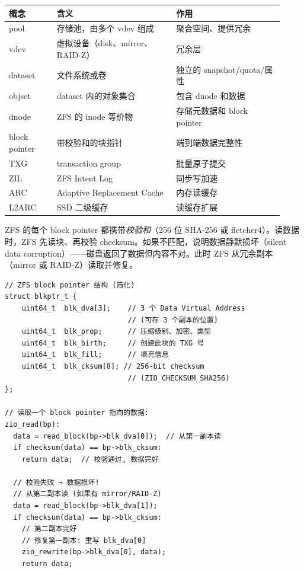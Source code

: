 \begin{filesystemlayout}
\begin{longtable}{|F{0.16\linewidth}|F{0.40\linewidth}|F{0.36\linewidth}|}
\toprule
{}
概念 & 含义 & 作用 \\
\midrule
pool & 存储池，由多个 vdev 组成 & 聚合空间、提供冗余 \\\tablerowrule
vdev & 虚拟设备（disk、mirror、RAID-Z） & 冗余层 \\\tablerowrule
dataset & 文件系统或卷 & 独立的 snapshot/quota/属性 \\\tablerowrule
objset & dataset 内的对象集合 & 包含 dnode 和数据 \\\tablerowrule
dnode & ZFS 的 inode 等价物 & 存储元数据和 block pointer \\\tablerowrule
block pointer & 带校验和的块指针 & 端到端数据完整性 \\\tablerowrule
TXG & transaction group & 批量原子提交 \\\tablerowrule
ZIL & ZFS Intent Log & 同步写加速 \\\tablerowrule
ARC & Adaptive Replacement Cache & 内存读缓存 \\\tablerowrule
L2ARC & SSD 二级缓存 & 读缓存扩展 \\
\bottomrule
\end{longtable}

ZFS 的每个 block pointer 都携带\emph{校验和}（256 位 SHA-256 或 fletcher4）。读数据时，ZFS 先读块、再校验 checksum。如果不匹配，说明数据静默损坏（silent data corruption）——磁盘返回了数据但内容不对。此时 ZFS 从冗余副本（mirror 或 RAID-Z）读取并修复。

\begin{lstlisting}
// ZFS block pointer 结构 (简化)
struct blkptr_t {
    uint64_t  blk_dva[3];    // 3 个 Data Virtual Address
                             // (可存 3 个副本的位置)
    uint64_t  blk_prop;      // 压缩级别、加密、类型
    uint64_t  blk_birth;     // 创建此块的 TXG 号
    uint64_t  blk_fill;      // 填充信息
    uint64_t  blk_cksum[8]; // 256-bit checksum
                             // (ZIO_CHECKSUM_SHA256)
};

// 读取一个 block pointer 指向的数据:
zio_read(bp):
  data = read_block(bp->blk_dva[0]);  // 从第一副本读
  if checksum(data) == bp->blk_cksum:
    return data;  // 校验通过, 数据完好

  // 校验失败 → 数据损坏!
  // 从第二副本读 (如果有 mirror/RAID-Z)
  data = read_block(bp->blk_dva[1]);
  if checksum(data) == bp->blk_cksum:
    // 第二副本完好
    // 修复第一副本: 重写 blk_dva[0]
    zio_rewrite(bp->blk_dva[0], data);
    return data;


\end{lstlisting}
\end{filesystemlayout}
